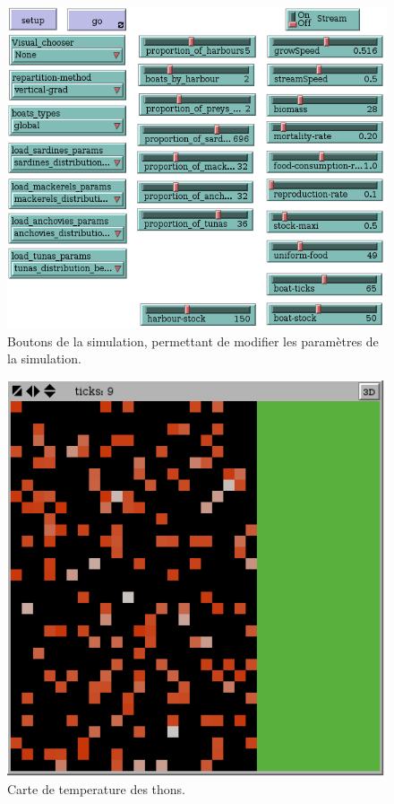 \begin{figure}[h]
  \begin{center}
    \includegraphics[scale=0.50]{img/boutons.png}
  \end{center}
  \caption{Boutons de la simulation, permettant de modifier les paramètres de la simulation.}
  \label{fig:boutons}
\end{figure}

\begin{figure}[h]
  \begin{center}
    \includegraphics[scale=0.50]{img/temperature.png}
  \end{center}
  \caption{Carte de temperature des thons.}
  \label{fig:temperature}
\end{figure}
